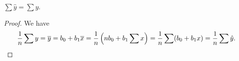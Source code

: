 \begin{thm}\label{frischwe}
$\sum\hat y = \sum y$.
\end{thm}
\begin{proof}
 We have
 \[
 	\frac1n\sum y = \overline y = b_0+b_1\overline x = \frac1n\left(nb_0+b_1\sum x\right) = \frac1n\sum(b_0+b_1x)=\frac1n\sum\hat y.\qedhere
\]
 \end{proof}
 
